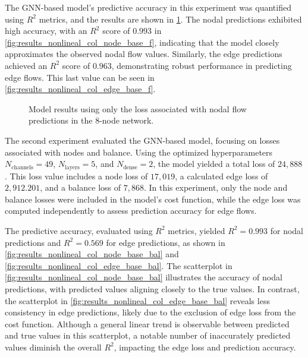 The GNN-based model's predictive accuracy in this experiment was quantified using \( R^2 \) metrics, and the results are shown in \cref{fig:col_base_f_results_non_lineal}. The nodal predictions exhibited high accuracy, with an \( R^2 \) score of \( 0.993 \) in \cref{fig:results_nonlineal_col_node_base_f}, indicating that the model closely approximates the observed nodal flow values. Similarly, the edge predictions achieved an \( R^2 \) score of \( 0.963 \), demonstrating robust performance in predicting edge flows. This last value can be seen in \cref{fig:results_nonlineal_col_edge_base_f}.


\begin{figure}
    \centering
    \setlength{}        
    \setlength{} 
    
    \caption{Model results using only the loss associated with nodal flow predictions in the 8-node network.}
    \label{fig:col_base_f_results_non_lineal}
\end{figure}


The second experiment evaluated the GNN-based model, focusing on losses associated with nodes and balance. Using the optimized hyperparameters \( N_{\text{channels}} = 49 \), \( N_{\text{layers}} = 5 \), and \( N_{\text{dense}} = 2 \), the model yielded a total loss of \( 24,888 \). This loss value includes a node loss of \( 17,019 \), a calculated edge loss of \( 2,912.201 \), and a balance loss of \( 7,868 \). In this experiment, only the node and balance losses were included in the model's cost function, while the edge loss was computed independently to assess prediction accuracy for edge flows.

The predictive accuracy, evaluated using \( R^2 \) metrics, yielded \( R^2 = 0.993 \) for nodal predictions and \( R^2 = 0.569 \) for edge predictions, as shown in \cref{fig:results_nonlineal_col_node_base_bal} and \cref{fig:results_nonlineal_col_edge_base_bal}. The scatterplot in \cref{fig:results_nonlineal_col_node_base_bal} illustrates the accuracy of nodal predictions, with predicted values aligning closely to the true values. In contrast, the scatterplot in \cref{fig:results_nonlineal_col_edge_base_bal} reveals less consistency in edge predictions, likely due to the exclusion of edge loss from the cost function. Although a general linear trend is observable between predicted and true values in this scatterplot, a notable number of inaccurately predicted values diminish the overall \( R^2 \), impacting the edge loss and prediction accuracy.




